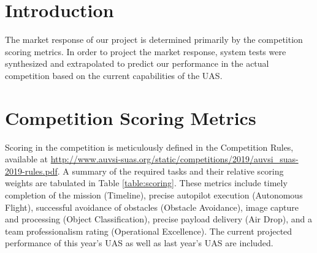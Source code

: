 \documentclass[]{auvsi_doc}
\begin{document}
\begin{AUVSITitlePage}
\begin{artifacttable}
\end{artifacttable}
\end{AUVSITitlePage}


\section{Introduction}
The market response of our project is determined primarily by the competition scoring metrics. In order to project the market response, system tests were synthesized and extrapolated to predict our performance in the actual competition based on the current capabilities of the UAS.

\section{Competition Scoring Metrics}
Scoring in the competition is meticulously defined in the Competition Rules, available at \url{http://www.auvsi-suas.org/static/competitions/2019/auvsi_suas-2019-rules.pdf}. A summary of the required tasks and their relative scoring weights are tabulated in Table \ref{table:scoring}. These metrics include timely completion of the mission (Timeline), precise autopilot execution (Autonomous Flight), successful avoidance of obstacles (Obstacle Avoidance), image capture and processing (Object Classification), precise payload delivery (Air Drop), and a team professionalism rating (Operational Excellence). The current projected performance of this year's UAS as well as last year's UAS are included.
\end{document}
